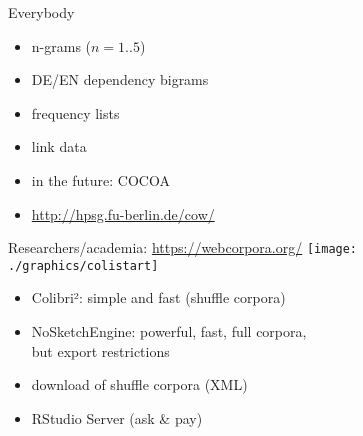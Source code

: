 
\begin{frame}
  {Everybody}
  \begin{itemize}
    \item n-grams ($n=1..5$)
    \item DE/EN dependency bigrams 
    \item frequency lists
    \item link data
    \item in the future: COCOA
    \item \url{http://hpsg.fu-berlin.de/cow/}
  \end{itemize}
\end{frame}

\begin{frame}
  {Researchers\slash academia: \url{https://webcorpora.org/}}
  \centering
  \texttt{[image: ./graphics/colistart]}  
  \begin{itemize}
    \item Colibri²: simple and fast (shuffle corpora)
    \item NoSketchEngine: powerful, fast, full corpora,\\
      but export restrictions
    \item download of shuffle corpora (XML)
    \item RStudio Server (ask \& pay)
  \end{itemize}
\end{frame}


